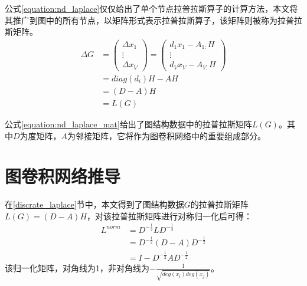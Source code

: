 公式\ref{equation:nd_laplace}仅仅给出了单个节点拉普拉斯算子的计算方法，本文将其推广到图中的所有节点，以矩阵形式表示拉普拉斯算子，该矩阵则被称为拉普拉斯矩阵。
\begin{equation}
    \begin{aligned}
        \Delta G &= \left(  \begin{array}{cccc}
            \Delta x_1 \\
            \vdots \\
            \Delta x_V
         \end{array} \right) = 
         \left(  \begin{array}{cccc}
            d_1x_1 - A_{1:}H \\
            \vdots \\
            d_Vx_V - A_{V:}H
         \end{array} \right)
        \\
        & =diag(d_i)H - AH \\
        & = (D-A)H \\
        & = L(G)
    \end{aligned}
    \label{equation:nd_laplace_mat}
\end{equation}

公式\ref{equation:nd_laplace_mat}给出了图结构数据中的拉普拉斯矩阵$L(G)$。其中$D$为度矩阵，$A$为邻接矩阵，它将作为图卷积网络中的重要组成部分。

\section{图卷积网络推导}
在\ref{discrate_laplace}节中，本文得到了图结构数据$G$的拉普拉斯矩阵$L(G) = (D-A)H$，对该拉普拉斯矩阵进行对称归一化后可得：
\begin{equation}
    \begin{aligned}
        L^{norm} &= D^{-\frac{1}{2}}L D^{-\frac{1}{2}} \\
        &= D^{-\frac{1}{2}}(D-A)D^{-\frac{1}{2}} \\
        &= I - D^{-\frac{1}{2}}A D^{-\frac{1}{2}}
    \end{aligned}
    \label{equation:norm_laplace}
\end{equation}
该归一化矩阵，对角线为1，非对角线为$-\frac{1}{\sqrt{deg(x_i)deg(x_j)} }$。

